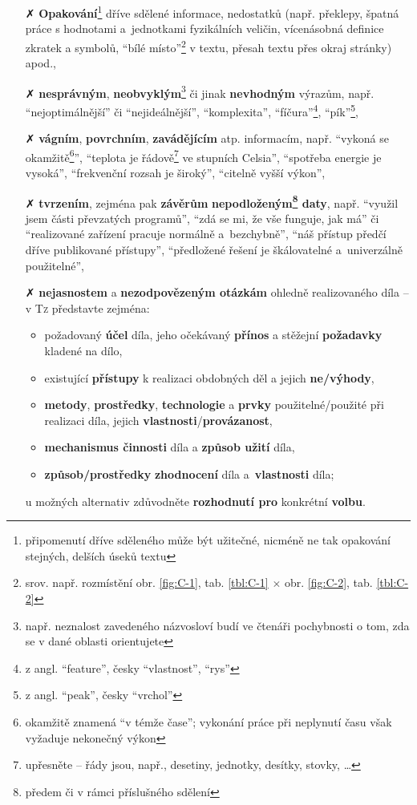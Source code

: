 \documentclass[a4paper,11pt, twoside]{report}
\begin{document}
\begin{itemize}
\item[\faClose] 
\textbf{Opakování}\footnote{připomenutí dříve sděleného může být užitečné, 
nicméně ne tak opakování stejných, delších úseků textu} 
dříve sdělené informace,
nedostatků (např. překlepy, špatná práce s hodnotami a~jednotkami fyzikálních veličin, vícenásobná definice zkratek a symbolů, ``bílé místo''\footnote{srov. např. rozmístění obr. \ref{fig:C-1}, tab. \ref{tbl:C-1} $\times$ obr. \ref{fig:C-2}, tab. \ref{tbl:C-2}} v textu, 
přesah textu přes okraj stránky) apod., 

\item[\faClose] 
\textbf{nesprávným}, \textbf{neobvyklým}\footnote{např. neznalost zavedeného názvosloví budí ve čtenáři pochybnosti o tom, zda se v dané oblasti orientujete}
 či jinak \textbf{nevhodným} výrazům, např. 
``nejoptimálnější'' či 
``nejideálnější'',
``komplexita'',
``fíčura''\footnote{z angl. ``feature'', česky ``vlastnost'', ``rys''},
``pík''\footnote{z angl. ``peak'', česky ``vrchol'' },
\item[\faClose]  
\textbf{vágním}, \textbf{povrchním}, \textbf{zavádějícím} atp. informacím, např.
``vykoná se okamžitě\footnote{okamžitě znamená ``v témže čase''; vykonání práce při neplynutí času však vyžaduje nekonečný výkon}'',
``teplota je řádově\footnote{upřesněte -- řády jsou, např., desetiny, jednotky, desítky, stovky, \ldots} ve stupních Celsia'',
``spotřeba energie je vysoká'',
``frekvenční rozsah je široký'', 
``citelně vyšší výkon'',



\item[\faClose] 
\textbf{tvrzením},  zejména pak \textbf{závěrům} \textbf{nepodloženým\footnote{předem či v rámci příslušného sdělení} daty}, 
např. 
``využil jsem části převzatých programů'',
``zdá se mi, že vše funguje, jak má'' či ``realizované zařízení pracuje normálně a~bezchybně'',
``náš přístup předčí dříve publikované přístupy'',
``předložené řešení je škálovatelné a~univerzálně použitelné'',

\item[\faClose] 
\textbf{nejasnostem} a
\textbf{nezodpovězeným otázkám}
ohledně realizovaného díla
-- v \textsc{Tz} 
představte zejména:
\begin{itemize}
\item
požadovaný \textbf{účel} díla, jeho očekávaný \textbf{přínos}
a
stěžejní \textbf{požadavky} kladené na dílo,
\item
existující \textbf{přístupy} k realizaci obdobných děl a jejich \textbf{ne/výhody},
\item
\textbf{metody}, \textbf{prostředky}, \textbf{technologie} a \textbf{prvky} použitelné/použité při realizaci díla, jejich \textbf{vlastnosti}/\textbf{provázanost}, 
\item
\textbf{mechanismus činnosti} díla a 
\textbf{způsob užití} díla,
\item
\textbf{způsob/prostředky} \textbf{zhodnocení} díla a~\textbf{vlastnosti} díla; 
\end{itemize}
u možných alternativ zdůvodněte \textbf{rozhodnutí pro} konkrétní \textbf{volbu}.

\end{itemize}
\end{document}

